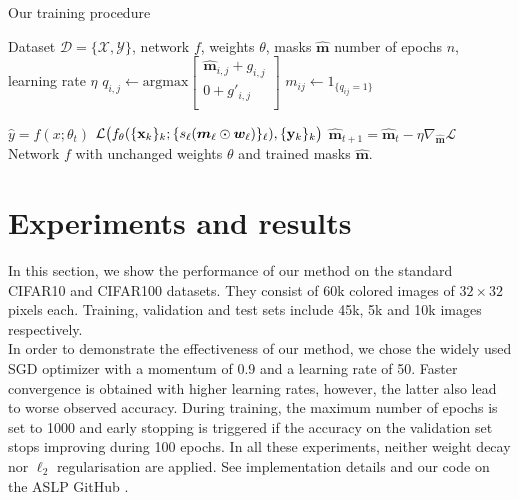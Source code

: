 \begin{algorithm}
  \caption{Our training procedure}
  \label{alg:chap2:ASLP}
  \begin{algorithmic}
  \REQUIRE Dataset $\mathcal{D} = \{\mathcal{X}, \mathcal{Y}\}$, network $f$,
  weights $\theta$, masks $\bm{\hat{m}}$ number of epochs $n$, learning rate $\eta$
        \STATE
        $q_{i,j} \gets \text{argmax} 
        \begin{bmatrix}
          \bm{\hat{m}}_{i,j} + g_{i,j} \\
          0 + g'_{i,j}\\
        \end{bmatrix}$     
        \STATE $m_{ij} \gets 1_{\{q_{ij}=1\}}$
          
      \STATE $\hat{y} = f(x; \theta_t)$ 
          \STATE ${\cal L}\big(f_\theta(\{{\bf x}_k\}_k;
          \{s_\ell (\bm{m}_\ell \odot \bm{w}_\ell)\}_\ell),\{{\bf y}_k\}_k\big)$ 
          \STATE $\bm{\hat{m}}_{t+1} = \bm{\hat{m}}_t - \eta \nabla_{\bm{\hat{m}}} \mathcal{L}$ 
      \ENDFOR
  \ENDFOR
  \RETURN Network $f$ with unchanged weights $\theta$ and trained masks $\bm{\hat{m}}$.
  \end{algorithmic}
  \end{algorithm}


\section{Experiments and results}
\label{sec:chap2:experiments}
  
In this section, we show the performance of our method on the standard CIFAR10
and CIFAR100 datasets.   They consist of  60k  colored images of $32\times 32$
pixels each.  Training,  validation and test sets  include  45k,  5k and 10k
images respectively.  \\  In order to demonstrate the effectiveness of our
method, we chose the widely used SGD optimizer with a momentum of  0.9  and a
learning rate of 50.    Faster convergence is obtained with higher learning
rates,   however,  the latter also lead  to worse observed accuracy.   During
training,  the maximum number of epochs is set to 1000 and early stopping is
triggered  if the accuracy on the validation set stops improving during 100
epochs.   In all these experiments, neither weight decay nor $\ell_2$
regularisation are applied. See implementation details and our code on the ASLP GitHub
\cite{Dupont2022}.


